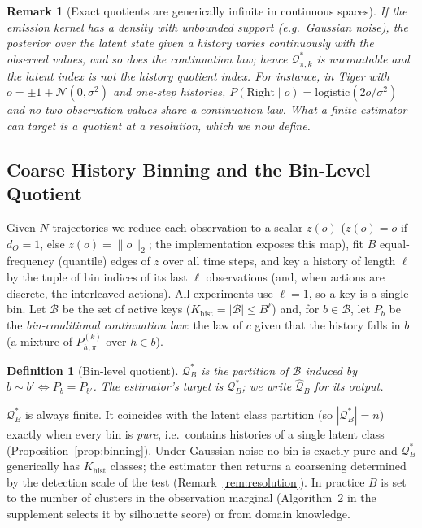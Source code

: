 \documentclass[10pt]{article}
\newtheorem{definition}{Definition}
\newtheorem{remark}{Remark}
\newcommand{\calQ}{\mathcal{Q}}
\newcommand{\calB}{\mathcal{B}}
\newcommand{\Qstar}{\mathcal{Q}^*}
\newcommand{\Khist}{K_{\mathrm{hist}}}
\begin{document}
\begin{remark}[Exact quotients are generically infinite in continuous spaces]
\label{rem:infinite}
If the emission kernel has a density with unbounded support (e.g.\ Gaussian
noise), the posterior over the latent state given a history varies
continuously with the observed values, and so does the continuation law; hence
$\Qstar_{\pi,k}$ is uncountable and the latent index is not the history
quotient index.  For instance, in Tiger with $o=\pm1+\mathcal N(0,\sigma^2)$
and one-step histories, $P(\text{Right}\mid o)=\mathrm{logistic}(2o/\sigma^2)$
and no two observation values share a continuation law.  What a finite
estimator can target is a quotient at a \emph{resolution}, which we now define.
\end{remark}

\subsection{Coarse History Binning and the Bin-Level Quotient}
\label{sec:binning}

Given $N$ trajectories we reduce each observation to a scalar
$z(o)$ ($z(o)=o$ if $d_O=1$, else $z(o)=\|o\|_2$; the implementation exposes
this map), fit $B$ equal-frequency (quantile) edges of $z$ over all time
steps, and key a history of length $\ell$ by the tuple of bin indices of its
last $\ell$ observations (and, when actions are discrete, the interleaved
actions).  All experiments use $\ell=1$, so a key is a single bin.  Let
$\calB$ be the set of active keys ($\Khist=|\calB|\le B^\ell$) and, for
$b\in\calB$, let $P_b$ be the \emph{bin-conditional continuation law}: the law
of $c$ given that the history falls in $b$ (a mixture of $P^{(k)}_{h,\pi}$
over $h\in b$).

\begin{definition}[Bin-level quotient]
$\Qstar_B$ is the partition of $\calB$ induced by $b\sim b'\iff P_b=P_{b'}$.
The estimator's target is $\Qstar_B$; we write $\widehat{\calQ}_B$ for its output.
\end{definition}

$\Qstar_B$ is always finite.  It coincides with the latent class partition
(so $|\Qstar_B|=n$) exactly when every bin is \emph{pure}, i.e.\ contains
histories of a single latent class (Proposition~\ref{prop:binning}).  Under
Gaussian noise no bin is exactly pure and $\Qstar_B$ generically has $\Khist$
classes; the estimator then returns a coarsening determined by the detection
scale of the test (Remark~\ref{rem:resolution}).  In practice $B$ is set to
the number of clusters in the observation marginal (Algorithm~2 in the
supplement selects it by silhouette score) or from domain knowledge.
\end{document}
